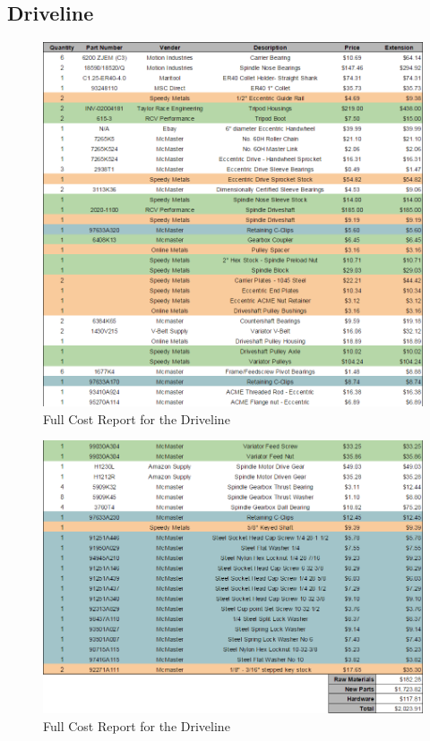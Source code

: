 \subsection{Driveline}

\begin{figure}[H]
    \centering
    \includegraphics[width=1.0\textwidth]{./images/Chapter4-BillofMaterials/CRD1}
    \caption{Full Cost Report for the Driveline}
    \label{fig:CRD}
\end{figure}
\begin{figure}[H]
    \centering
    \includegraphics[width=1.0\textwidth]{./images/Chapter4-BillofMaterials/CRD2}
    \caption{Full Cost Report for the Driveline}
    \label{fig:CRD}
\end{figure}

